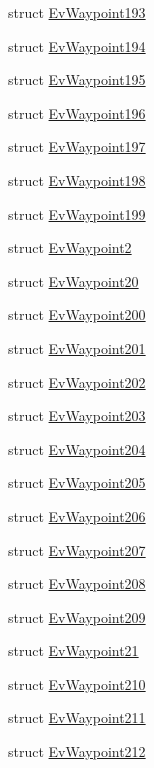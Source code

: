 \begin{DoxyCompactItemize}
\item 
struct \hyperlink{structsmacc_1_1EvWaypoint193}{Ev\+Waypoint193}
\item 
struct \hyperlink{structsmacc_1_1EvWaypoint194}{Ev\+Waypoint194}
\item 
struct \hyperlink{structsmacc_1_1EvWaypoint195}{Ev\+Waypoint195}
\item 
struct \hyperlink{structsmacc_1_1EvWaypoint196}{Ev\+Waypoint196}
\item 
struct \hyperlink{structsmacc_1_1EvWaypoint197}{Ev\+Waypoint197}
\item 
struct \hyperlink{structsmacc_1_1EvWaypoint198}{Ev\+Waypoint198}
\item 
struct \hyperlink{structsmacc_1_1EvWaypoint199}{Ev\+Waypoint199}
\item 
struct \hyperlink{structsmacc_1_1EvWaypoint2}{Ev\+Waypoint2}
\item 
struct \hyperlink{structsmacc_1_1EvWaypoint20}{Ev\+Waypoint20}
\item 
struct \hyperlink{structsmacc_1_1EvWaypoint200}{Ev\+Waypoint200}
\item 
struct \hyperlink{structsmacc_1_1EvWaypoint201}{Ev\+Waypoint201}
\item 
struct \hyperlink{structsmacc_1_1EvWaypoint202}{Ev\+Waypoint202}
\item 
struct \hyperlink{structsmacc_1_1EvWaypoint203}{Ev\+Waypoint203}
\item 
struct \hyperlink{structsmacc_1_1EvWaypoint204}{Ev\+Waypoint204}
\item 
struct \hyperlink{structsmacc_1_1EvWaypoint205}{Ev\+Waypoint205}
\item 
struct \hyperlink{structsmacc_1_1EvWaypoint206}{Ev\+Waypoint206}
\item 
struct \hyperlink{structsmacc_1_1EvWaypoint207}{Ev\+Waypoint207}
\item 
struct \hyperlink{structsmacc_1_1EvWaypoint208}{Ev\+Waypoint208}
\item 
struct \hyperlink{structsmacc_1_1EvWaypoint209}{Ev\+Waypoint209}
\item 
struct \hyperlink{structsmacc_1_1EvWaypoint21}{Ev\+Waypoint21}
\item 
struct \hyperlink{structsmacc_1_1EvWaypoint210}{Ev\+Waypoint210}
\item 
struct \hyperlink{structsmacc_1_1EvWaypoint211}{Ev\+Waypoint211}
\item 
struct \hyperlink{structsmacc_1_1EvWaypoint212}{Ev\+Waypoint212}
\item 

\end{DoxyCompactItemize}
